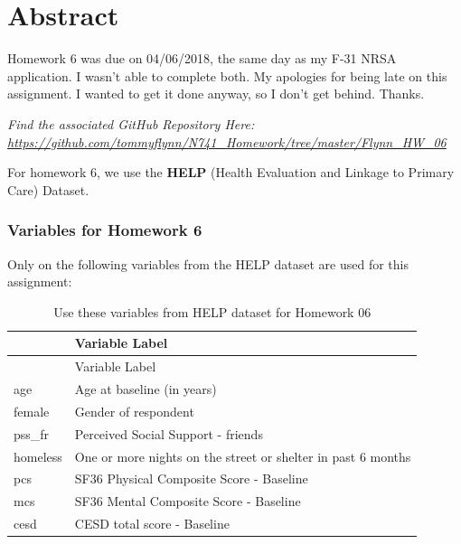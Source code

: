 \documentclass[10pt,letterpaper]{article}
\date{}
\newcommand{\getIndex}[2]{
  \ForEach{,}{\IfEq{#1}{\thislevelitem}{\number\thislevelcount\ExitForEach}{}}{#2}
}
\newcommand{\getAff}[1]{
  \getIndex{#1}{}
}
\begin{document}
\vspace*{0.2in}

\section*{Abstract}
Homework 6 was due on 04/06/2018, the same day as my F-31 NRSA
application. I wasn't able to complete both. My apologies for being late
on this assignment. I wanted to get it done anyway, so I don't get
behind. Thanks.


\linenumbers

\emph{Find the associated GitHub Repository Here:
\url{https://github.com/tommyflynn/N741_Homework/tree/master/Flynn_HW_06}}

For homework 6, we use the \textbf{HELP} (Health Evaluation and Linkage
to Primary Care) Dataset.

\subsubsection{Variables for Homework 6}\label{variables-for-homework-6}

Only on the following variables from the HELP dataset are used for this
assignment:

\begin{longtable}[]{@{}ll@{}}
\caption{Use these variables from HELP dataset for Homework
06}\tabularnewline
\toprule
& Variable Label\tabularnewline
\midrule
\endfirsthead
\toprule
& Variable Label\tabularnewline
\midrule
\endhead
age & Age at baseline (in years)\tabularnewline
female & Gender of respondent\tabularnewline
pss\_fr & Perceived Social Support - friends\tabularnewline
homeless & One or more nights on the street or shelter in past 6
months\tabularnewline
pcs & SF36 Physical Composite Score - Baseline\tabularnewline
mcs & SF36 Mental Composite Score - Baseline\tabularnewline
cesd & CESD total score - Baseline\tabularnewline
\bottomrule
\end{longtable}
\end{document}
